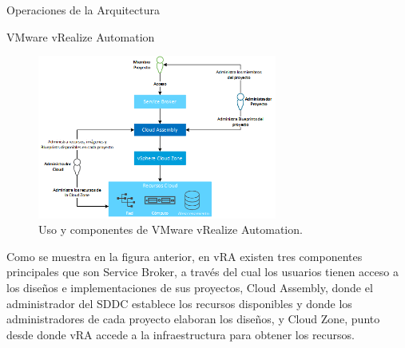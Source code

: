 \begin{subsection}{Operaciones de la Arquitectura}
\begin{subsubsection}{VMware vRealize Automation}
        \begin{figure}[h]
            \centering
            \includegraphics[width=0.7\textwidth]{imaxes/vRealize_pruebaconcepto/ComponentesVRA.png}
            \caption{Uso y componentes de VMware vRealize Automation.}
            \label{fig:vra-components}
        \end{figure}
        \FloatBarrier
        Como se muestra en la figura anterior, en vRA existen tres componentes principales que son Service Broker, a través del cual los usuarios tienen acceso a los diseños e implementaciones de sus proyectos, Cloud Assembly, donde el administrador del SDDC establece los recursos disponibles y donde los administradores de cada proyecto elaboran los diseños, y Cloud Zone, punto desde donde vRA accede a la infraestructura para obtener los recursos.
        \\

\end{subsubsection}
\end{subsection}
